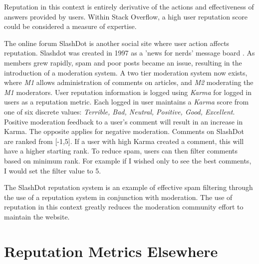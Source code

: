

Reputation in this context is entirely derivative of the actions and effectiveness of answers provided by users. Within Stack Overflow, a high user reputation score could be considered a measure of expertise.

The online forum SlashDot \cite{slashdot_site} is another social site where user action affects reputation. Slashdot was created in 1997 as a 'news for nerds' message board \cite{josang2007survey}. As members grew rapidly, spam and poor posts became an issue, resulting in the introduction of a moderation system. A two tier moderation system now exists, where \textit{M1} allows administration of comments on articles, and \textit{M2} moderating the \textit{M1} moderators. User reputation information is logged using \textit{Karma} for logged in users as a reputation metric. Each logged in user maintains a \textit{Karma} score from one of six discrete values: \textit{Terrible, Bad, Neutral, Positive, Good, Excellent}. Positive moderation feedback to a user's comment will result in an increase in Karma. The opposite applies for negative moderation. Comments on SlashDot are ranked from [-1,5]. If a user with high Karma created a comment, this will have a higher starting rank. To reduce spam, users 
can then filter comments based on minimum rank. For example if I wished only to see the best comments, I would set the filter value to 5. 

The SlashDot reputation system is an example of effective spam filtering through the use of a reputation system in conjunction with moderation. The use of reputation in this context greatly reduces the moderation community effort to maintain the website. 




\section{Reputation Metrics Elsewhere}

